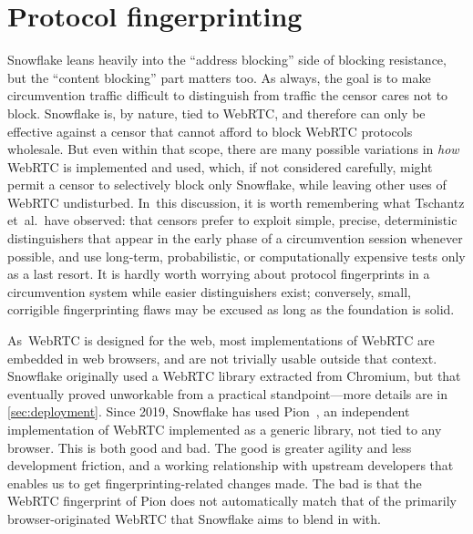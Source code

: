 \documentclass[letterpaper,twocolumn]{article}
\begin{document}
\section{Protocol fingerprinting}
\label{sec:fingerprinting}


Snowflake leans heavily into the ``address blocking'' side of blocking resistance,
but the ``content blocking'' part matters too.
As always, the goal is to make circumvention traffic
difficult to distinguish from traffic the censor cares not to block.
Snowflake is, by nature, tied to WebRTC,
and therefore can only be effective against a censor
that cannot afford to block WebRTC protocols wholesale.
But even within that scope,
there are many possible variations in \emph{how}
WebRTC is implemented and used,
which, if not considered carefully, might permit a censor
to selectively block only Snowflake,
while leaving other uses of WebRTC undisturbed.
In~this discussion, it is worth remembering
what Tschantz et~al.\ have observed\cite[\mbox{VI-A}]{Tschantz2016a}:
that censors prefer to exploit
simple, precise, deterministic distinguishers
that appear in the early phase of a circumvention session whenever possible,
and use long-term, probabilistic, or computationally expensive tests
only as a last resort.
It is hardly worth worrying about protocol fingerprints
in a circumvention system while easier distinguishers exist;
conversely, small, corrigible fingerprinting flaws may be excused
as long as the foundation is solid.

As~WebRTC is designed for the web,
most implementations of WebRTC are embedded in web browsers,
and are not trivially usable outside that context.
Snowflake originally used a WebRTC library extracted from Chromium,
but that eventually proved unworkable from a practical standpoint---more
details are in \autoref{sec:deployment}.
Since 2019, Snowflake has used Pion~\cite{pion-webrtc},
an independent implementation of WebRTC
implemented as a generic library,
not tied to any browser.
This is both good and bad.
The good is greater agility and less development friction,
and a working relationship with upstream developers
that enables us to get fingerprinting-related changes made.
The bad is that the WebRTC fingerprint of Pion
does not automatically match that of the primarily browser-originated
WebRTC that Snowflake aims to blend in with.
\end{document}
